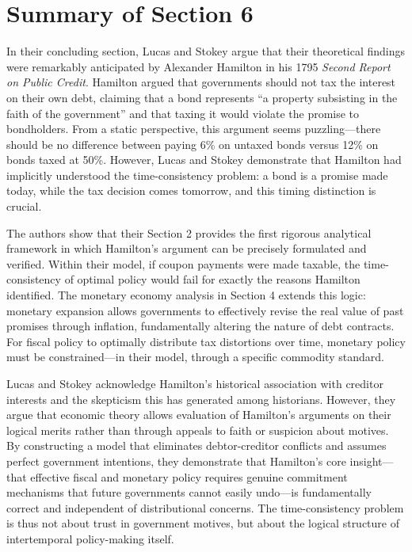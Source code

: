 \documentclass[12pt]{article}
\begin{document}
\newpage

\section*{Summary of Section 6}

In their concluding section, Lucas and Stokey argue that their theoretical findings were remarkably anticipated by Alexander Hamilton in his 1795 \textit{Second Report on Public Credit}. Hamilton argued that governments should not tax the interest on their own debt, claiming that a bond represents ``a property subsisting in the faith of the government'' and that taxing it would violate the promise to bondholders. From a static perspective, this argument seems puzzling---there should be no difference between paying 6\% on untaxed bonds versus 12\% on bonds taxed at 50\%. However, Lucas and Stokey demonstrate that Hamilton had implicitly understood the time-consistency problem: a bond is a promise made today, while the tax decision comes tomorrow, and this timing distinction is crucial.

The authors show that their Section 2 provides the first rigorous analytical framework in which Hamilton's argument can be precisely formulated and verified. Within their model, if coupon payments were made taxable, the time-consistency of optimal policy would fail for exactly the reasons Hamilton identified. The monetary economy analysis in Section 4 extends this logic: monetary expansion allows governments to effectively revise the real value of past promises through inflation, fundamentally altering the nature of debt contracts. For fiscal policy to optimally distribute tax distortions over time, monetary policy must be constrained---in their model, through a specific commodity standard.

Lucas and Stokey acknowledge Hamilton's historical association with creditor interests and the skepticism this has generated among historians. However, they argue that economic theory allows evaluation of Hamilton's arguments on their logical merits rather than through appeals to faith or suspicion about motives. By constructing a model that eliminates debtor-creditor conflicts and assumes perfect government intentions, they demonstrate that Hamilton's core insight---that effective fiscal and monetary policy requires genuine commitment mechanisms that future governments cannot easily undo---is fundamentally correct and independent of distributional concerns. The time-consistency problem is thus not about trust in government motives, but about the logical structure of intertemporal policy-making itself.
\end{document}
